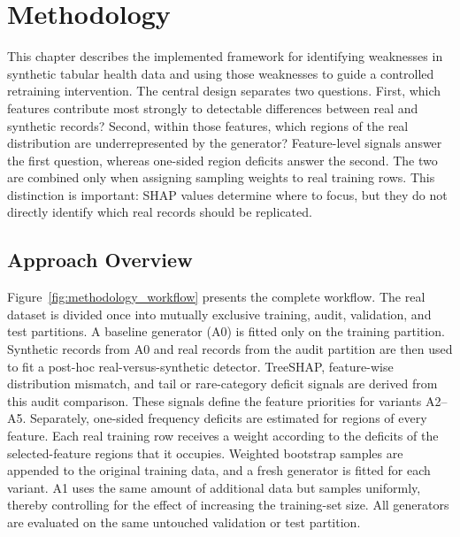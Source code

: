 
\chapter{Methodology}
\label{chap:methodology}

This chapter describes the implemented framework for identifying weaknesses in
synthetic tabular health data and using those weaknesses to guide a controlled
retraining intervention. The central design separates two questions. First,
which features contribute most strongly to detectable differences between real
and synthetic records? Second, within those features, which regions of the real
distribution are underrepresented by the generator? Feature-level signals
answer the first question, whereas one-sided region deficits answer the second.
The two are combined only when assigning sampling weights to real training
rows. This distinction is important: SHAP values determine where to focus, but
they do not directly identify which real records should be replicated.

\section{Approach Overview}
\label{sec:approach_overview}

Figure~\ref{fig:methodology_workflow} presents the complete workflow. The real
dataset is divided once into mutually exclusive training, audit, validation,
and test partitions. A baseline generator (A0) is fitted only on the training
partition. Synthetic records from A0 and real records from the audit partition
are then used to fit a post-hoc real-versus-synthetic detector. TreeSHAP,
feature-wise distribution mismatch, and tail or rare-category deficit signals
are derived from this audit comparison. These signals define the feature
priorities for variants A2--A5. Separately, one-sided frequency deficits are
estimated for regions of every feature. Each real training row receives a
weight according to the deficits of the selected-feature regions that it
occupies. Weighted bootstrap samples are appended to the original training
data, and a fresh generator is fitted for each variant. A1 uses the same amount
of additional data but samples uniformly, thereby controlling for the effect
of increasing the training-set size. All generators are evaluated on the same
untouched validation or test partition.

